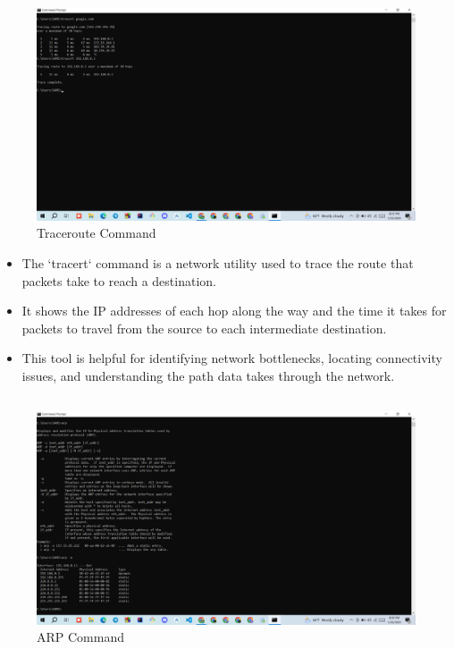 \documentclass[11pt]{article}
\begin{document}
\subsection{}
\begin{figure}[!h]
\centering
\includegraphics[width=\textwidth]{Screenshot (3).png}
\caption{Traceroute Command}
\end{figure}

\begin{itemize}
  \item The `tracert` command is a network utility used to trace the route that packets take to reach a destination.
  \item It shows the IP addresses of each hop along the way and the time it takes for packets to travel from the source to each intermediate destination.
  \item This tool is helpful for identifying network bottlenecks, locating connectivity issues, and understanding the path data takes through the network.
\end{itemize}



\subsection{}
\begin{figure}[!h]
\centering
\includegraphics[width=\textwidth]{Screenshot (4).png}
\caption{ARP Command}
\end{figure}
\end{document}
